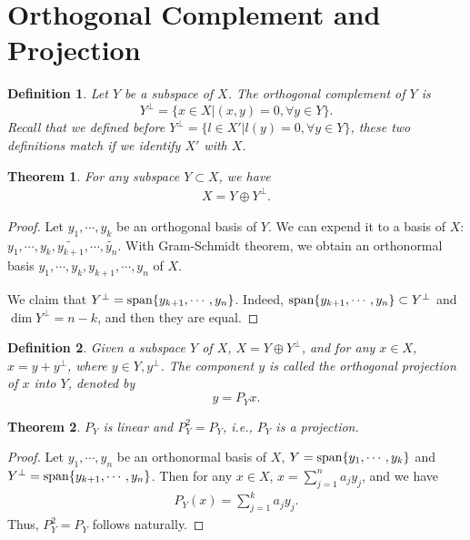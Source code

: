 \documentclass[11pt]{book}
\newtheorem{definition}{Definition}[section]
\newtheorem{theorem}{Theorem}[section]
\theoremstyle{definition}
\numberwithin{equation}{subsection}
\begin{document}
\medskip

\section{Orthogonal Complement and Projection}
\begin{definition}
Let $Y$ be a subspace of $X$. The orthogonal complement of $Y$ is $$Y^\perp = \{x\in X | (x,y) = 0, \forall y \in Y\}.$$
Recall that we defined before $Y^\perp = \{l\in X' | l(y) = 0, \forall y \in Y\}$, these two definitions match if we identify $X'$ with $X$.
\end{definition}


\medskip

\begin{theorem}
For any subspace $Y\subset X$, we have
\begin{align*}
    X = Y \oplus Y^\perp.
\end{align*}
\end{theorem}
\begin{proof}
Let $y_1,\cdots,y_k$ be an orthogonal basis of $Y$. We can expend it to a basis of $X$: $y_1,\cdots,y_k, \widetilde{y_{k+1}}, \cdots, \widetilde{y_{n}}$. With Gram-Schmidt theorem, we obtain an orthonormal basis $y_1,\cdots,y_k,y_{k+1},\cdots,y_n$ of $X$. 

We claim that $Y^\perp = {\rm span}\{y_{k+1},\cdots,y_n\}$. Indeed, ${\rm span}\{y_{k+1},\cdots,y_n\}\subset Y^\perp$ and $\dim Y^\perp = n-k$, and then they are equal.
\end{proof}

\medskip

\begin{definition}
Given a subspace $Y$ of $X$, $X = Y \oplus Y^\perp$, and for any $x\in X$, $x = y + y^\perp$, where $y\in Y, y^\perp$. The component $y$ is called the orthogonal projection of $x$ into $Y$, denoted by $$y = P_Y x.$$ 
\end{definition}

\medskip

\begin{theorem}
$P_Y$ is linear and $P_Y^2 = P_Y$, i.e., $P_Y$ is a projection.
\end{theorem}
\begin{proof}
Let $y_1,\cdots,y_n$ be an orthonormal basis of $X$, $Y = {\rm span}\{y_1,\cdots,y_k\}$ and $Y^\perp = {\rm span}\{y_{k+1},\cdots,y_n\}$. Then for any $x\in X$, $x = \sum^n_{j=1}a_j y_j$, and we have
\begin{align*}
    P_Y(x) = \sum^k_{j=1} a_j y_j.
\end{align*}
Thus, $P_Y^2 = P_Y$ follows naturally.
\end{proof}
\end{document}
